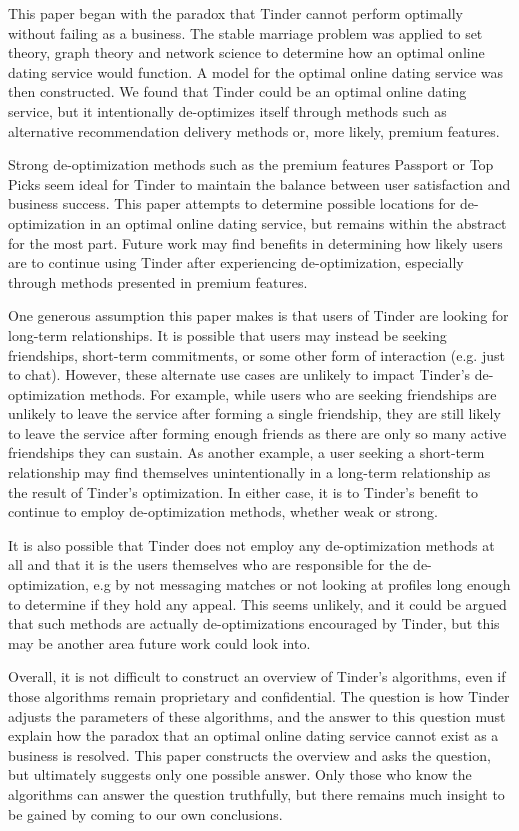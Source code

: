 This paper began with the paradox that Tinder cannot perform optimally without failing as a business. The stable marriage problem was applied to set theory, graph theory and network science to determine how an optimal online dating service would function. A model for the optimal online dating service was then constructed. We found that Tinder could be an optimal online dating service, but it intentionally de-optimizes itself through methods such as alternative recommendation delivery methods or, more likely, premium features.

Strong de-optimization methods such as the premium features Passport or Top Picks seem ideal for Tinder to maintain the balance between user satisfaction and business success. This paper attempts to determine possible locations for de-optimization in an optimal online dating service, but remains within the abstract for the most part. Future work may find benefits in determining how likely users are to continue using Tinder after experiencing de-optimization, especially through methods presented in premium features.

One generous assumption this paper makes is that users of Tinder are looking for long-term relationships. It is possible that users may instead be seeking friendships, short-term commitments, or some other form of interaction (e.g. just to chat). However, these alternate use cases are unlikely to impact Tinder's de-optimization methods. For example, while users who are seeking friendships are unlikely to leave the service after forming a single friendship, they are still likely to leave the service after forming enough friends as there are only so many active friendships they can sustain. As another example, a user seeking a short-term relationship may find themselves unintentionally in a long-term relationship as the result of Tinder's optimization. In either case, it is to Tinder's benefit to continue to employ de-optimization methods, whether weak or strong.

It is also possible that Tinder does not employ any de-optimization methods at all and that it is the users themselves who are responsible for the de-optimization, e.g by not messaging matches or not looking at profiles long enough to determine if they hold any appeal. This seems unlikely, and it could be argued that such methods are actually de-optimizations encouraged by Tinder, but this may be another area future work could look into.

Overall, it is not difficult to construct an overview of Tinder's algorithms, even if those algorithms remain proprietary and confidential. The question is how Tinder adjusts the parameters of these algorithms, and the answer to this question must explain how the paradox that an optimal online dating service cannot exist as a business is resolved. This paper constructs the overview and asks the question, but ultimately suggests only one possible answer. Only those who know the algorithms can answer the question truthfully, but there remains much insight to be gained by coming to our own conclusions.